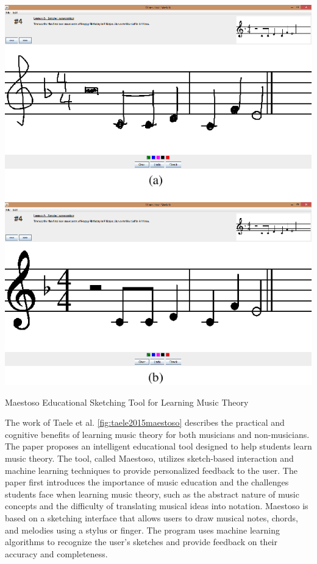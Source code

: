 \begin{marginfigure}
    \centering
    \includegraphics{images/maestoso.png}
    \caption{Maestoso Educational
    Sketching Tool for Learning Music Theory}
    \label{fig:taele2015maestoso}
\end{marginfigure}

The work of Taele et al. \cite{taele2015maestoso} \ref{fig:taele2015maestoso} describes the practical and cognitive benefits of learning music theory for both musicians and non-musicians. The paper proposes an intelligent educational tool designed to help students learn music theory. The tool, called Maestoso, utilizes sketch-based interaction and machine learning techniques to provide personalized feedback to the user.
The paper first introduces the importance of music education and the challenges students face when learning music theory, such as the abstract nature of music concepts and the difficulty of translating musical ideas into notation.
Maestoso is based on a sketching interface that allows users to draw musical notes, chords, and melodies using a stylus or finger. The program uses machine learning algorithms to recognize the user's sketches and provide feedback on their accuracy and completeness.

